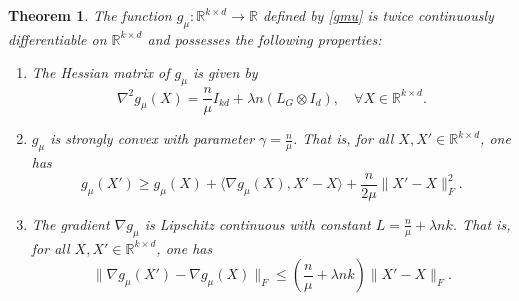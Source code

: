 \documentclass[11pt]{article}
\newtheorem{theorem}{Theorem}[section]
\theoremstyle{definition}
\newcommand{\R}{\mathbb{R}}
\newcommand{\1}{\mathbf{1}}
\begin{document}
\begin{theorem} \label{thm:smoothness-special}
The function $g_\mu\colon \R^{k\times d}\to \R$ defined by \eqref{gmu} is twice continuously differentiable on $\mathbb{R}^{k\times d}$ and possesses the following properties:
\begin{enumerate}
    \item[{\rm(a)}] The Hessian matrix of $g_\mu$ is given by
    \begin{equation}\label{eq:full-hessian}
    \nabla^2 g_\mu(X) = \frac{n}{\mu} I_{kd} + \lambda n (L_G \otimes I_d), \quad \forall X \in \mathbb{R}^{k \times d}.
    \end{equation}
    
    \item[{\rm(b)}] $g_\mu$ is strongly convex with parameter $\gamma = \frac{n}{\mu}$. That is, for all $X, X' \in \mathbb{R}^{k\times d}$, one has
    \begin{equation*}
    g_\mu(X') \ge g_\mu(X) + \langle \nabla g_\mu(X), X'-X \rangle + \frac{n}{2\mu}\|X'-X\|_F^2.
    \end{equation*}
    
    \item[{\rm(c)}] The gradient $\nabla g_\mu$ is Lipschitz continuous with constant $L = \frac{n}{\mu} + \lambda nk$. That is, for all $X, X' \in \mathbb{R}^{k \times d}$, one has
    \begin{equation*}
    \|\nabla g_\mu(X') - \nabla g_\mu(X)\|_F \le \left( \frac{n}{\mu} + \lambda n k \right) \|X' - X\|_F.
    \end{equation*}
\end{enumerate}
\end{theorem}
\end{document}

